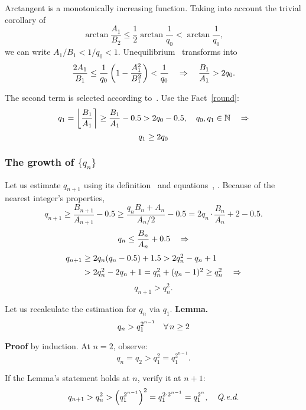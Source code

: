 \documentclass[draft, 10pt]{article} %
\def\fact#1{Fact~\ref{#1}}
\begin{document}
Arctangent is a monotonically increasing function.
Taking into account the trivial corollary of~
$$
\arctan \dfrac{A_1}{B_2} \le \dfrac{1}{2} \arctan \dfrac{1}{q_0} < \arctan \dfrac{1}{q_0},
$$
we can write $A_1/B_1 < 1/q_0 < 1$. Unequilibrium~ transforms into
%
\begin{equation}\mlabel{first-remainder-frac}
\dfrac{2A_1}{B_1} \le \dfrac{1}{q_0} \left( 1 - \dfrac{A_1^2}{B_1^2} \right) < \dfrac{1}{q_0}
    \quad\ergo\quad \dfrac{B_1}{A_1} > 2 q_0.
\end{equation}

The second term is selected according to~. Use the \fact{round}:
$$
q_1 = \nround{ \dfrac{B_1}{A_1} } \ge \dfrac{B_1}{A_1} - 0.5 > 2 q_0 - 0.5,
    \quad q_0, q_1 \in \N \quad\ergo
$$
\begin{equation}\mlabel{second-term-double}
q_1 \ge 2 q_0
\end{equation}

\subsubsection{The growth of $\{ q_n \}$}

Let us estimate $q_{n+1}$ using its definition~ and equations~,
. Because of the nearest integer's properties,
$$
q_{n+1} \ge \dfrac{B_{n+1}}{A_{n+1}} - 0.5 \ge \dfrac{q_n B_n + A_n}{A_n / 2} - 0.5
    = 2 q_n \cdot \dfrac{B_n}{A_n} + 2 - 0.5.
$$
$$
q_n \le \dfrac{B_n}{A_n} + 0.5 \quad\ergo
$$
$$
\begin{array}{l}
q_{n+1} \ge 2 q_n ( q_n - 0.5 ) + 1.5 > 2 q_n^2 - q_n + 1 \\[0.5em]
\phantom{q_{n+1}} > 2 q_n^2 - 2 q_n + 1 = q_n^2 + (q_n - 1)^2 \ge q_n^2 \quad\ergo
\end{array}
$$
$$
q_{n+1} > q_n^2.
$$

Let us recalculate the estimation for $q_n$ via $q_1$.
{\bf Lemma.\/}
%
\begin{equation}\mlabel{estimate-qn1}
q_n > q_1 ^ {2^{n-1}} \quad \forall\, n \ge 2
\end{equation}

{\bf Proof\/} by induction. At $n=2$, observe:
$$
q_n = q_2 > q_1^2 = q_1^{2^{n-1}}.
$$

If the Lemma's statement holds at $n$, verify it at $n+1$:
$$
q_{n+1} > q_n^2 >\left( q_1^{2^{n-1}} \right)^2 = q_1^{2 \cdot 2^{n-1}} = q_1^{2^n},
    \quad\hbox{\qed}
$$
\end{document}
